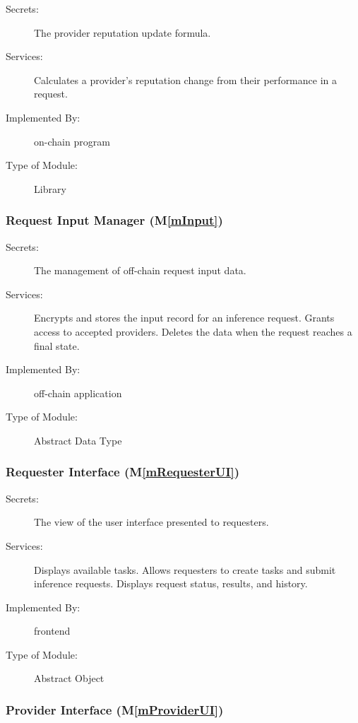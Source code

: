\documentclass[12pt, titlepage]{article}
\newcommand{\mref}[1]{M\ref{#1}}
\begin{document}
\begin{description}
\item[Secrets:] The provider reputation update formula.
\item[Services:] Calculates a provider's reputation change from their
  performance in a request.
\item[Implemented By:] \progname{} on-chain program
\item[Type of Module:] Library
\end{description}

\subsubsection{Request Input Manager (\mref{mInput})}

\begin{description}
\item[Secrets:] The management of off-chain request input data.
\item[Services:] Encrypts and stores the input record for an inference request.
 Grants access to accepted providers. Deletes the data when the request reaches a final state.
\item[Implemented By:] \progname{} off-chain application
\item[Type of Module:] Abstract Data Type
\end{description}

\subsubsection{Requester Interface (\mref{mRequesterUI})}

\begin{description}
\item[Secrets:] The view of the user interface presented to requesters.
\item[Services:] Displays available tasks. Allows requesters to create tasks
  and submit inference requests. Displays request status, results, and history.
\item[Implemented By:] \progname{} frontend
\item[Type of Module:] Abstract Object
\end{description}

\subsubsection{Provider Interface (\mref{mProviderUI})}
\end{document}
